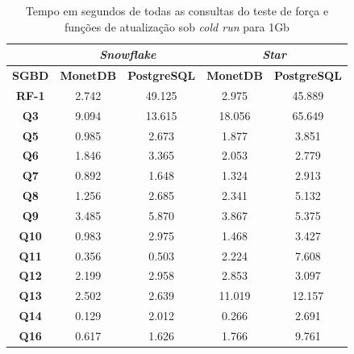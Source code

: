 \begin{table}[htpb]
        \centering
        \caption{Tempo em segundos de todas as consultas do teste de força e funções de atualização sob \textit{cold run} para 1Gb}
        \label{tab:queries_cold_1}
        \begin{tabular}{|c|c|c|c|c|}
        \hline
        & \multicolumn{2}{c|}{\textit{\textbf{Snowflake}}} & \multicolumn{2}{c|}{\textit{\textbf{Star}}} \\ \hline
        \textbf{SGBD}  & \textbf{MonetDB}      & \textbf{PostgreSQL}      & \textbf{MonetDB}    & \textbf{PostgreSQL}   \\ \hline
        \textbf{RF-1}  & 2.742             & 49.125              & 2.975          & 45.889            \\ \hline
        \textbf{Q3}    & 9.094             & 13.615              & 18.056         & 65.649            \\ \hline
        \textbf{Q5}    & 0.985             & 2.673               & 1.877          & 3.851             \\ \hline
        \textbf{Q6}    & 1.846             & 3.365               & 2.053          & 2.779             \\ \hline
        \textbf{Q7}    & 0.892             & 1.648               & 1.324          & 2.913             \\ \hline
        \textbf{Q8}    & 1.256             & 2.685               & 2.341          & 5.132             \\ \hline
        \textbf{Q9}    & 3.485             & 5.870               & 3.867          & 5.375             \\ \hline
        \textbf{Q10}   & 0.983             & 2.975               & 1.468          & 3.427             \\ \hline
        \textbf{Q11}   & 0.356             & 0.503               & 2.224          & 7.608             \\ \hline
        \textbf{Q12}   & 2.199             & 2.958               & 2.853          & 3.097             \\ \hline
        \textbf{Q13}   & 2.502             & 2.639               & 11.019         & 12.157            \\ \hline
        \textbf{Q14}   & 0.129             & 2.012               & 0.266          & 2.691             \\ \hline
        \textbf{Q16}   & 0.617             & 1.626               & 1.766          & 9.761             \\ \hline

\end{tabular}
\end{table}

